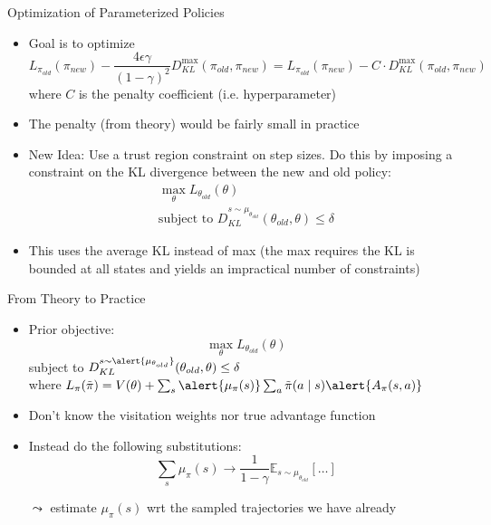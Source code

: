 \documentclass[aspectratio=169]{../latex_main/tntbeamer}  %
\begin{document}
\begin{frame}[c]{Optimization of Parameterized Policies}
	
    \begin{itemize}
        \item Goal is to optimize
        $$ L_{\pi_{old}} (\pi_{new}) -  \frac{4\epsilon\gamma}{(1-\gamma)^2} D_{KL}^{\max}(\pi_{old}, \pi_{new}) = L_{\pi_{old}} (\pi_{new}) -  C \cdot D_{KL}^{\max}(\pi_{old}, \pi_{new}) $$
        where $C$ is the penalty coefficient (i.e. hyperparameter)
        \item The penalty (from theory) would be fairly small in practice
        \medskip
        \item New Idea: Use a trust region constraint on step sizes. Do this by imposing a constraint on the KL divergence between the new and old policy:
        \begin{eqnarray}
        \max_{\theta} L_{\theta_{old}} (\theta)\\
        \text{subject to } D_{KL}^{s \sim \mu_{\theta_{old}}} (\theta_{old}, \theta) \leq \delta
        \end{eqnarray}
        \item This uses the average KL instead of max (the max requires the KL is bounded at all states and yields an impractical number of constraints)
    \end{itemize}
    
\end{frame}
\begin{frame}[c]{From Theory to Practice}
	
    \begin{itemize}
        \item Prior objective:
        $$ \max_{\theta} L_{\theta_{old}} (\theta)$$
        {\centering subject to $ D_{KL}^{s \sim \alert{\mu_{\theta_{old}}}} (\theta_{old}, \theta) \leq \delta$\\}
        where $ L_\pi(\Tilde{\pi}) = V(\theta) + \sum_{s} \alert{\mu_\pi (s)} \sum_{a} \Tilde{\pi}(a \mid s) \alert{A_\pi(s,a)}$ 
        \item Don't know the visitation weights nor true advantage function
        \pause
        \item Instead do the following substitutions:
        $$ \sum_{s} \mu_\pi (s) \to \frac{1}{1- \gamma} \mathbb{E}_{s\sim \mu_{\theta_{old}}} [\ldots]$$
        \item[$\leadsto$] estimate $\mu_\pi (s)$ wrt the sampled trajectories we have already
    \end{itemize}

\end{frame}
\end{document}
